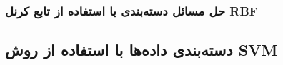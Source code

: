 \subsubsection{حل مسائل دسته‌بندی  با استفاده از تابع کرنل RBF}


\subsection{دسته‌بندی داده‌ها با استفاده از روش SVM}
